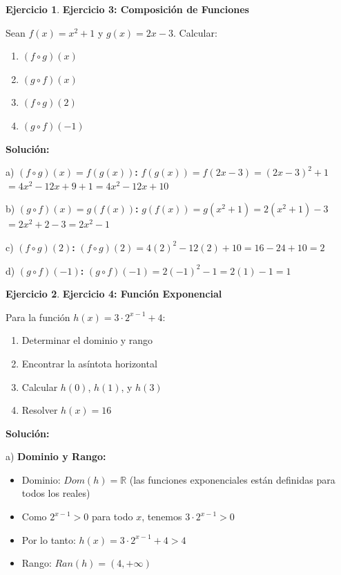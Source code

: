 \documentclass[12pt, a4paper, oneside]{book}
\theoremstyle{definition}
\newtheorem{ejercicio}{Ejercicio}[chapter]
\begin{document}
\begin{ejercicio}
\textbf{Ejercicio 3: Composición de Funciones}

Sean $f(x) = x^2 + 1$ y $g(x) = 2x - 3$. Calcular:
\begin{enumerate}[label=\alph*)]
    \item $(f \circ g)(x)$
    \item $(g \circ f)(x)$
    \item $(f \circ g)(2)$
    \item $(g \circ f)(-1)$
\end{enumerate}
\end{ejercicio}

\textbf{Solución:}

a) \textbf{$(f \circ g)(x) = f(g(x))$:}
$f(g(x)) = f(2x - 3) = (2x - 3)^2 + 1$
$= 4x^2 - 12x + 9 + 1 = 4x^2 - 12x + 10$

b) \textbf{$(g \circ f)(x) = g(f(x))$:}
$g(f(x)) = g(x^2 + 1) = 2(x^2 + 1) - 3$
$= 2x^2 + 2 - 3 = 2x^2 - 1$

c) \textbf{$(f \circ g)(2)$:}
$(f \circ g)(2) = 4(2)^2 - 12(2) + 10 = 16 - 24 + 10 = 2$

d) \textbf{$(g \circ f)(-1)$:}
$(g \circ f)(-1) = 2(-1)^2 - 1 = 2(1) - 1 = 1$

\begin{ejercicio}
\textbf{Ejercicio 4: Función Exponencial}

Para la función $h(x) = 3 \cdot 2^{x-1} + 4$:
\begin{enumerate}[label=\alph*)]
    \item Determinar el dominio y rango
    \item Encontrar la asíntota horizontal
    \item Calcular $h(0)$, $h(1)$, y $h(3)$
    \item Resolver $h(x) = 16$
\end{enumerate}
\end{ejercicio}

\textbf{Solución:}

a) \textbf{Dominio y Rango:}
\begin{itemize}
    \item Dominio: $Dom(h) = \mathbb{R}$ (las funciones exponenciales están definidas para todos los reales)
    \item Como $2^{x-1} > 0$ para todo $x$, tenemos $3 \cdot 2^{x-1} > 0$
    \item Por lo tanto: $h(x) = 3 \cdot 2^{x-1} + 4 > 4$
    \item Rango: $Ran(h) = (4, +\infty)$
\end{itemize}
\end{document}

